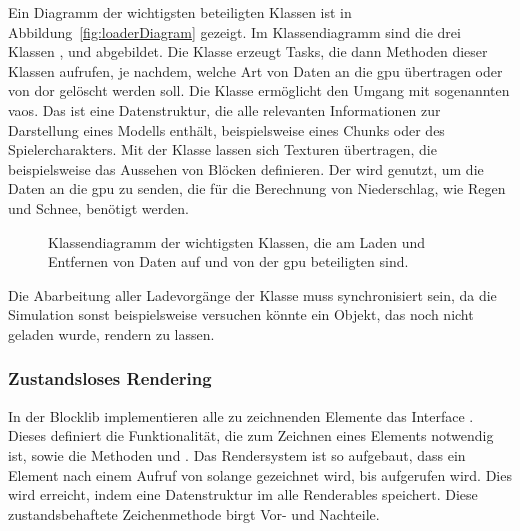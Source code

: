 Ein Diagramm der wichtigsten beteiligten Klassen ist in Abbildung~\vref{fig:loaderDiagram} gezeigt. Im Klassendiagramm sind die drei Klassen ,  und  abgebildet. Die Klasse  erzeugt Tasks, die dann Methoden dieser Klassen aufrufen, je nachdem, welche Art von Daten an die \ac{gpu} übertragen oder von dor gelöscht werden soll. Die Klasse  ermöglicht den Umgang mit sogenannten \acp{vao}. Das ist eine Datenstruktur, die alle relevanten Informationen zur Darstellung eines Modells enthält, beispielsweise eines Chunks oder des Spielercharakters. Mit der Klasse  lassen sich Texturen übertragen, die beispielsweise das Aussehen von Blöcken definieren. Der  wird genutzt, um die Daten an die \ac{gpu} zu senden, die für die Berechnung von Niederschlag, wie Regen und Schnee, benötigt werden.
\begin{figure}
	
	\caption{Klassendiagramm der wichtigsten Klassen, die am Laden und Entfernen von Daten auf und von der \ac{gpu} beteiligten sind.}\label{fig:loaderDiagram}
\end{figure}

Die Abarbeitung aller Ladevorgänge der Klasse  muss synchronisiert sein, da die Simulation sonst beispielsweise versuchen könnte ein Objekt, das noch nicht geladen wurde, rendern zu lassen. 

\subsubsection{Zustandsloses Rendering}\label{sec:statelessRendering}
In der Blocklib implementieren alle zu zeichnenden Elemente das Interface . Dieses definiert die Funktionalität, die zum Zeichnen eines Elements notwendig ist, sowie die Methoden  und . Das Rendersystem ist so aufgebaut, dass ein Element nach einem Aufruf von  solange gezeichnet wird, bis  aufgerufen wird. Dies wird erreicht, indem eine Datenstruktur im  alle Renderables speichert. Diese zustandsbehaftete Zeichenmethode birgt Vor- und Nachteile.


